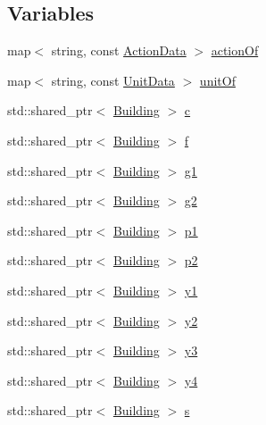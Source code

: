\subsection*{Variables}
\begin{DoxyCompactItemize}
\item 
map$<$ string, const \hyperlink{structghost_1_1ActionData}{Action\-Data} $>$ \hyperlink{namespaceghost_a39cb7cc32473e2ea03f0192af2c832fc}{action\-Of}
\item 
map$<$ string, const \hyperlink{structghost_1_1UnitData}{Unit\-Data} $>$ \hyperlink{namespaceghost_ab5bef690341741098adffdc2a214a5aa}{unit\-Of}
\item 
std\-::shared\-\_\-ptr$<$ \hyperlink{classghost_1_1Building}{Building} $>$ \hyperlink{namespaceghost_a1e04a626798fce7a46db973e9693354e}{c}
\item 
std\-::shared\-\_\-ptr$<$ \hyperlink{classghost_1_1Building}{Building} $>$ \hyperlink{namespaceghost_a79c82e0d4f18942474a997e6421358f4}{f}
\item 
std\-::shared\-\_\-ptr$<$ \hyperlink{classghost_1_1Building}{Building} $>$ \hyperlink{namespaceghost_a69c92ddb4f46d01dc2b21ff8b6c7abdd}{g1}
\item 
std\-::shared\-\_\-ptr$<$ \hyperlink{classghost_1_1Building}{Building} $>$ \hyperlink{namespaceghost_a06d6bb1ff9795198ea63e209711cfc9e}{g2}
\item 
std\-::shared\-\_\-ptr$<$ \hyperlink{classghost_1_1Building}{Building} $>$ \hyperlink{namespaceghost_ad597936cfadde60ce8c6ed70f14c242c}{p1}
\item 
std\-::shared\-\_\-ptr$<$ \hyperlink{classghost_1_1Building}{Building} $>$ \hyperlink{namespaceghost_a47f813abed554f342cbabdd87c34a89e}{p2}
\item 
std\-::shared\-\_\-ptr$<$ \hyperlink{classghost_1_1Building}{Building} $>$ \hyperlink{namespaceghost_af02ccfe4153013ca001f67b21cb8ba43}{y1}
\item 
std\-::shared\-\_\-ptr$<$ \hyperlink{classghost_1_1Building}{Building} $>$ \hyperlink{namespaceghost_ab6fc6f6a8069edbc2ae66e3f4c95e988}{y2}
\item 
std\-::shared\-\_\-ptr$<$ \hyperlink{classghost_1_1Building}{Building} $>$ \hyperlink{namespaceghost_a48fd5802a1f5deeffa729a4be630b172}{y3}
\item 
std\-::shared\-\_\-ptr$<$ \hyperlink{classghost_1_1Building}{Building} $>$ \hyperlink{namespaceghost_a959bf3d4c6eabc2dda3faeed7e7ea7a9}{y4}
\item 
std\-::shared\-\_\-ptr$<$ \hyperlink{classghost_1_1Building}{Building} $>$ \hyperlink{namespaceghost_a21eab9fd4ae07c7db20e824cc4452a97}{s}

\end{DoxyCompactItemize}
